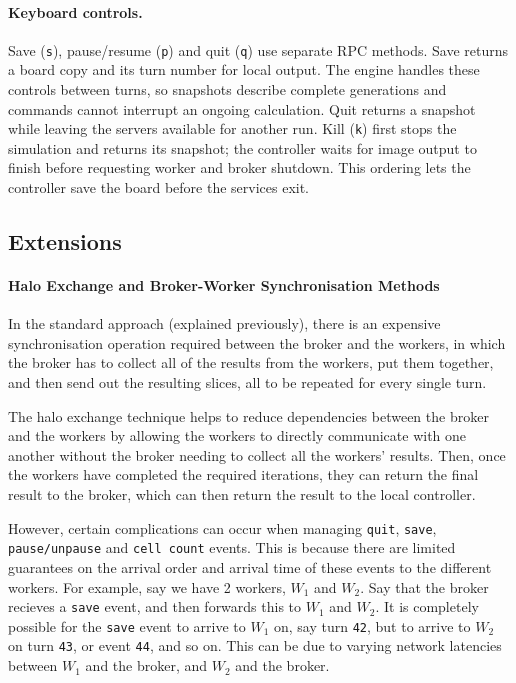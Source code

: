 \documentclass[10pt,a4paper,twocolumn]{article}
\begin{document}
\paragraph{Keyboard controls.}
Save (\texttt{s}), pause/resume (\texttt{p}) and quit (\texttt{q}) use separate
RPC methods. Save returns a board copy and its turn number for local output.
The engine handles these controls between turns, so snapshots describe
complete generations and commands cannot interrupt an ongoing calculation.
Quit returns a snapshot while leaving the servers available for another run.
Kill (\texttt{k}) first stops the simulation and returns its snapshot; the
controller waits for image output to finish before requesting worker and
broker shutdown. This ordering lets the controller save the board before
the services exit.

\subsection{Extensions}

\paragraph{Halo Exchange and Broker-Worker Synchronisation Methods}
In the standard approach (explained previously), there is an
expensive synchronisation operation required between the broker and the workers,
in which the broker has to collect all of the results from the workers, put them together,
and then send out the resulting slices, all to be repeated for every single turn.

The halo exchange technique helps to reduce dependencies between the broker and the workers by
allowing the workers to directly communicate with one another without the broker needing
to collect all the workers' results. Then, once the workers have completed the required iterations,
they can return the final result to the broker, which can then return the result to the
local controller.

However, certain complications can occur when managing \texttt{quit},
\texttt{save}, \texttt{pause/unpause} and \texttt{cell count} events.
This is because there are limited guarantees on the arrival order and arrival time of
these events to the different workers. For example, say we have 2 workers, $W_{1}$
and $W_{2}$. Say that the broker recieves a \texttt{save} event, and then forwards
this to $W_{1}$ and $W_{2}$. It is completely possible for the \texttt{save}
event to arrive to $W_{1}$ on, say turn \texttt{42}, but to arrive to $W_{2}$
on turn \texttt{43}, or event \texttt{44}, and so on. This can be due to varying network
latencies between $W_{1}$ and the broker, and $W_{2}$ and the broker.
\end{document}
